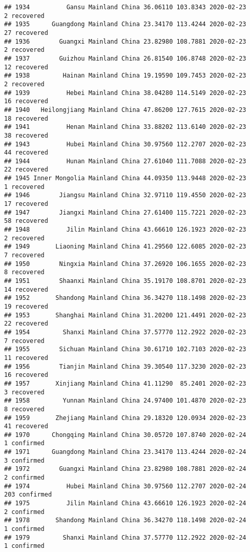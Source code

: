 \documentclass[
]{article}
\begin{document}
\begin{verbatim}
## 1934          Gansu Mainland China 36.06110 103.8343 2020-02-23     2 recovered
## 1935      Guangdong Mainland China 23.34170 113.4244 2020-02-23    27 recovered
## 1936        Guangxi Mainland China 23.82980 108.7881 2020-02-23     2 recovered
## 1937        Guizhou Mainland China 26.81540 106.8748 2020-02-23    12 recovered
## 1938         Hainan Mainland China 19.19590 109.7453 2020-02-23     2 recovered
## 1939          Hebei Mainland China 38.04280 114.5149 2020-02-23    16 recovered
## 1940   Heilongjiang Mainland China 47.86200 127.7615 2020-02-23    18 recovered
## 1941          Henan Mainland China 33.88202 113.6140 2020-02-23    38 recovered
## 1943          Hubei Mainland China 30.97560 112.2707 2020-02-23    44 recovered
## 1944          Hunan Mainland China 27.61040 111.7088 2020-02-23    22 recovered
## 1945 Inner Mongolia Mainland China 44.09350 113.9448 2020-02-23     1 recovered
## 1946        Jiangsu Mainland China 32.97110 119.4550 2020-02-23    17 recovered
## 1947        Jiangxi Mainland China 27.61400 115.7221 2020-02-23    58 recovered
## 1948          Jilin Mainland China 43.66610 126.1923 2020-02-23     2 recovered
## 1949       Liaoning Mainland China 41.29560 122.6085 2020-02-23     7 recovered
## 1950        Ningxia Mainland China 37.26920 106.1655 2020-02-23     8 recovered
## 1951        Shaanxi Mainland China 35.19170 108.8701 2020-02-23    14 recovered
## 1952       Shandong Mainland China 36.34270 118.1498 2020-02-23    19 recovered
## 1953       Shanghai Mainland China 31.20200 121.4491 2020-02-23    22 recovered
## 1954         Shanxi Mainland China 37.57770 112.2922 2020-02-23     7 recovered
## 1955        Sichuan Mainland China 30.61710 102.7103 2020-02-23    11 recovered
## 1956        Tianjin Mainland China 39.30540 117.3230 2020-02-23    16 recovered
## 1957       Xinjiang Mainland China 41.11290  85.2401 2020-02-23     3 recovered
## 1958         Yunnan Mainland China 24.97400 101.4870 2020-02-23     8 recovered
## 1959       Zhejiang Mainland China 29.18320 120.0934 2020-02-23    41 recovered
## 1970      Chongqing Mainland China 30.05720 107.8740 2020-02-24     1 confirmed
## 1971      Guangdong Mainland China 23.34170 113.4244 2020-02-24     3 confirmed
## 1972        Guangxi Mainland China 23.82980 108.7881 2020-02-24     2 confirmed
## 1974          Hubei Mainland China 30.97560 112.2707 2020-02-24   203 confirmed
## 1975          Jilin Mainland China 43.66610 126.1923 2020-02-24     2 confirmed
## 1978       Shandong Mainland China 36.34270 118.1498 2020-02-24     1 confirmed
## 1979         Shanxi Mainland China 37.57770 112.2922 2020-02-24     1 confirmed

\end{verbatim}
\end{document}
